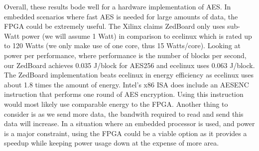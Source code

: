 Overall, these results bode well for a hardware implementation of AES. In embedded scenarios where fast AES is needed for large amounts of data, the FPGA could be extremely useful. The Xilinx claims ZedBoard only uses sub-Watt power (we will assume 1 Watt) in comparison to ecelinux which is rated up to 120 Watts (we only make use of one core, thus 15 Watts/core). Looking at power per performance, where performance is the number of blocks per second, our ZedBoard achieves 0.035 J/block for AES256 and ecelinux uses 0.063 J/block. The ZedBoard implementation beats ecelinux in energy efficiency as ecelinux uses about 1.8 times the amount of energy. Intel's x86 ISA does include an AESENC instruction that performs one round of AES encryption. Using this instruction would most likely use comparable energy to the FPGA. Another thing to consider is as we send more data, the bandwith required to read and send this data will increase. In a situation where an embedded processor is used, and power is a major constraint, using the FPGA could be a viable option as it provides a speedup while keeping power usage down at the expense of more area.
